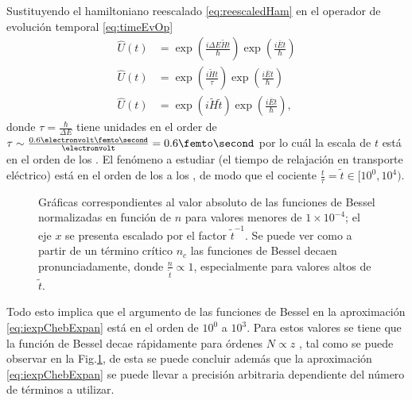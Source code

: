 Sustituyendo el hamiltoniano reescalado \eqref{eq:reescaledHam} en el operador de evolución temporal \eqref{eq:timeEvOp}
\begin{align*}
	\hat{U}(t) &= \exp({\frac{i\Delta E\tilde{H}t}\hbar}) \exp(\frac{i\bar E t}\hbar) \\
	\hat{U}(t) &= \exp({\frac{i\tilde{H}t}\tau}) \exp(\frac{i\bar E t}\hbar)\\
	\hat{U}(t) &= \exp(i\tilde{H}\tilde t) \exp(\frac{i\bar E t}\hbar),
\end{align*}
donde $\tau = \frac\hbar{\Delta E}$ tiene unidades en el order de 
$\tau \sim \frac{0.6 \electronvolt\femto\second}{\electronvolt} = 0.6\femto\second$ 
por lo cuál la escala de $t$ está en el orden de los \femto\second. El fenómeno a estudiar 
(el tiempo de relajación en transporte eléctrico) está en el orden de los 
\femto\second{} a los \pico\second{} \autocite{Fan2018}, de modo que el cociente 
$\frac{t}{\tau} = \tilde{t} \in [10^0, 10^4)$.

\iffalse
\begin{figure}[bth]
	\centering
	
	\caption{Gráficas de los polinomios de Chebyshev $J_n(t)$ para $N=1050$ términos. Se puede observar cómo los valores del polinomio decaen monotónicamente a partir de $n \approx t$ para cada valor de $t$.}
	\label{fig:gn_Jn(t)}
\end{figure}
\fi

\begin{figure}[htb]
	\centering
	
	\caption{Gráficas correspondientes al valor absoluto de las funciones de Bessel normalizadas en función de $n$ para valores menores de $1\times10^{-4}$; el eje $x$ se presenta escalado por el factor $\tilde{t}^{-1}$. Se puede ver como a partir de un término crítico $n_c$ las funciones de Bessel decaen pronunciadamente, donde $\frac n{\tilde t} \propto 1$, especialmente para valores altos de $\tilde{t}$.}
	\label{fig:normJ_n(t)}
\end{figure}

Todo esto implica que el argumento de las funciones de Bessel en la aproximación \eqref{eq:iexpChebExpan} está en el 
orden de $10^0$ a $10^3$. Para estos valores se tiene que la función de Bessel decae rápidamente para órdenes $N \propto 
z$ \autocite{Fan2018}, tal como se puede observar en la Fig.\ref{fig:normJ_n(t)}, de esta se puede concluir además que la
aproximación \eqref{eq:iexpChebExpan} se puede llevar a precisión arbitraria dependiente del número de términos a
utilizar.

